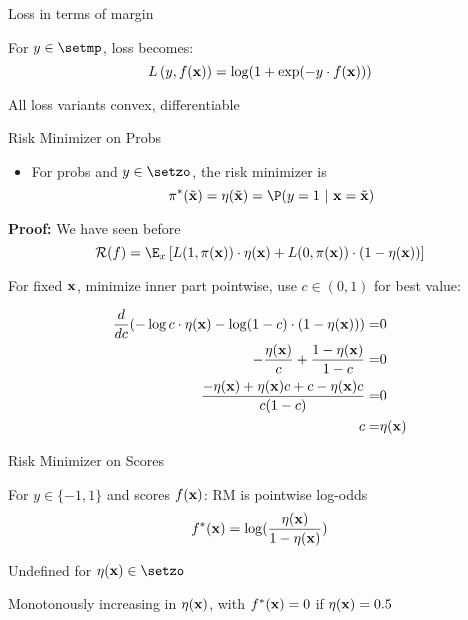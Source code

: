 \documentclass[11pt,compress,t,notes=noshow, xcolor=table]{beamer}
\begin{document}
\begin{framei}[sep=M]{Loss in terms of margin}

\item For $y \in \setmp$, loss becomes: 
$$
L\left(y, f(\mathbf{x})\right) = \log(1+\exp(-y \cdot f(\mathbf{x}))) 
$$
\item All loss variants convex, differentiable

\vfill



\end{framei}


\begin{frame}{Risk Minimizer on Probs}

\begin{itemize}
\item For probs and $y \in \setzo$, the risk minimizer is
$$
\piastxtil = \eta(\xtil) = \P(y = 1 ~|~ \xv = \xtil) 
$$
\end{itemize}


\textbf{Proof:} We have seen before
$$
\riskf = \E_x \left[L(1, \pix) \cdot \eta(\xv) + L(0, \pix) \cdot (1 - \eta(\xv)) \right]
$$

For fixed $\mathbf{x}$, minimize inner part pointwise, use $c\in(0,1)$ for best value:

{\footnotesize
\begin{align*}
\frac{d }{d c} (- \log c  \cdot \eta(\mathbf{x})- \log (1 - c) \cdot (1 - \eta(\mathbf{x}))) =& 0 \\
- \frac{\eta(\mathbf{x})}{c} + \frac{1 - \eta(\mathbf{x})}{1 - c} =& 0 \\
\frac{- \eta(\mathbf{x}) + \eta(\mathbf{x}) c + c - \eta(\mathbf{x}) c}{c (1 - c)} =& 0 \\
c =& \eta(\mathbf{x})
\end{align*}
}

\end{frame}

\begin{framei}[sep=S]{Risk Minimizer on Scores}

\item For $y \in \{-1, 1\}$ and scores $f(\mathbf{x})$: RM is pointwise log-odds
$$f^{\ast}(\mathbf{x}) =  \log (\frac{\eta(\mathbf{x}) }{1-\eta(\mathbf{x}) })$$
\item Undefined for $\eta(\xv) \in \setzo$
\item Monotonously increasing in $\eta(\mathbf{x})$, with  $f^{\ast}(\mathbf{x}) = 0$ if $\eta(\mathbf{x})=0.5$

\vfill



\end{framei}
\end{document}
